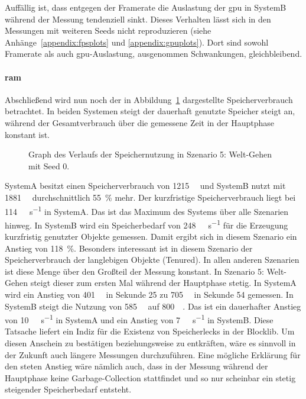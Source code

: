 Auffällig ist, dass entgegen der Framerate die Auslastung der \ac{gpu} in SystemB während der Messung tendenziell sinkt. Dieses Verhalten lässt sich in den Messungen mit weiteren Seeds nicht reproduzieren (siehe Anhänge~\vref{appendix:fpsplots} und \vref{appendix:gpuplots}). Dort sind sowohl Framerate als auch \ac{gpu}-Auslastung, ausgenommen Schwankungen, gleichbleibend.

\paragraph{\ac{ram}}
Abschließend wird nun noch der in Abbildung~\ref{fig:seed-0-walk-mem} dargestellte Speicherverbrauch betrachtet. In beiden Systemen steigt der dauerhaft genutzte Speicher steigt an, während der Gesamtverbrauch über die gemessene Zeit in der Hauptphase konstant ist.
\begin{figure}[!htbp]
	\caption{Graph des Verlaufs der Speichernutzung in Szenario 5: Welt-Gehen mit Seed 0.}\label{fig:seed-0-walk-mem}
\end{figure} 
SystemA besitzt einen Speicherverbrauch von \SI{1215}{\mega\byte} und SystemB nutzt mit \SI{1881}{\mega\byte} durchschnittlich \SI{55}{\percent} mehr. Der kurzfristige Speicherverbrauch liegt bei \SI{114}{\mega\byte\per\second} in SystemA. Das ist das Maximum des Systems über alle Szenarien hinweg. In SystemB wird ein Speicherbedarf von \SI{248}{\mega\byte\per\second} für die Erzeugung kurzfristig genutzter Objekte gemessen. Damit ergibt sich in diesem Szenario ein Anstieg von \SI{118}{\percent}. Besonders interessant ist in diesem Szenario der Speicherverbrauch der langlebigen Objekte (Tenured). In allen anderen Szenarien ist diese Menge über den Großteil der Messung konstant.
In Szenario 5: Welt-Gehen steigt dieser zum ersten Mal während der Hauptphase stetig. In SystemA wird ein Anstieg von \SI{401}{\mega\byte} in Sekunde 25 zu \SI{705}{\mega\byte} in Sekunde 54 gemessen. In SystemB steigt die Nutzung von \SI{585}{\mega\byte} auf \SI{800}{\mega\byte}. Das ist ein dauerhafter Anstieg von \SI{10}{\mega\byte\per\second} in SystemA und ein Anstieg von \SI{7}{\mega\byte\per\second} in SystemB. Diese Tatsache liefert ein Indiz für die Existenz von Speicherlecks in der Blocklib. Um diesen Anschein zu bestätigen beziehungsweise zu entkräften, wäre es sinnvoll in der Zukunft auch längere Messungen durchzuführen. Eine mögliche Erklärung für den steten Anstieg wäre nämlich auch, dass in der Messung während der Hauptphase keine Garbage-Collection stattfindet und so nur scheinbar ein stetig steigender Speicherbedarf entsteht.

